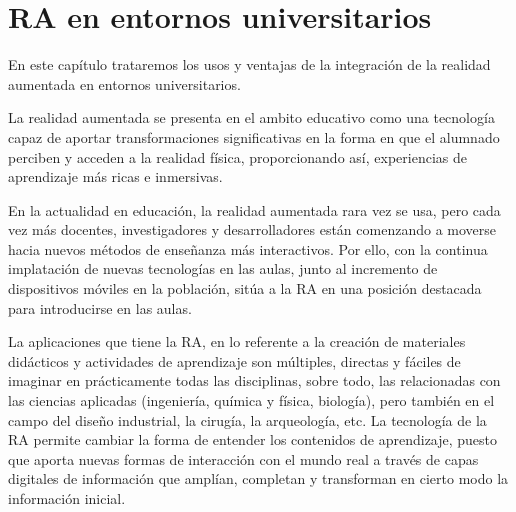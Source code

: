 %
%
%
%


\chapter{RA en entornos universitarios } \label{chap:RAEntornosUniversitarios}  

En este capítulo trataremos los usos y ventajas de la integración de la realidad aumentada en entornos universitarios.

La realidad aumentada se presenta en el ambito educativo como una tecnología capaz de aportar transformaciones significativas en la forma en que el alumnado perciben y acceden a la realidad física, proporcionando así, experiencias de aprendizaje más ricas e inmersivas.

En la actualidad en educación, la realidad aumentada rara vez se usa, pero cada vez más docentes, investigadores y desarrolladores están comenzando a moverse hacia nuevos métodos de enseñanza más interactivos. Por ello, con la continua implatación de nuevas tecnologías en las aulas, junto al incremento de dispositivos móviles en la población, sitúa a la RA en una posición destacada para introducirse en las aulas. 


La aplicaciones que tiene la RA, en lo referente a la creación de materiales didácticos y actividades de aprendizaje son múltiples, directas y fáciles de imaginar en prácticamente todas las disciplinas, sobre todo, las relacionadas con las ciencias aplicadas (ingeniería, química y física, biología), pero también en el campo del diseño industrial, la cirugía, la arqueología, etc.
La tecnología de la RA permite cambiar la forma de entender los contenidos de aprendizaje, puesto que aporta nuevas formas de interacción con el mundo real a través de capas digitales de información que amplían, completan y transforman en cierto modo la información inicial.


